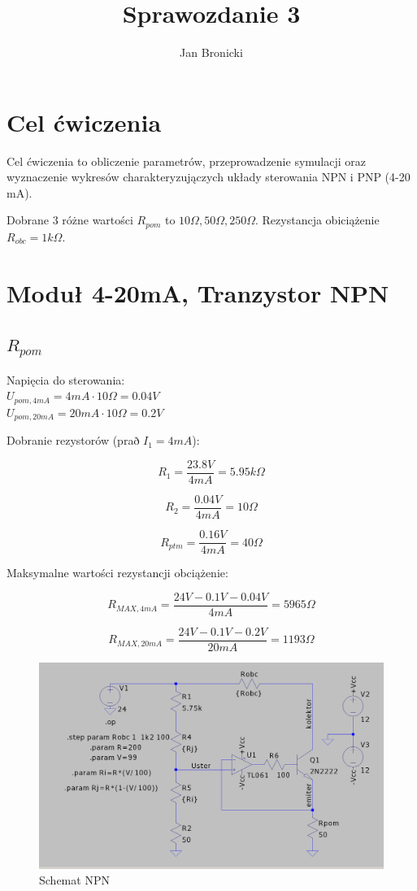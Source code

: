 \documentclass{article}
\title{Sprawozdanie 3}
\author{Jan Bronicki}
\date{}
\begin{document}
\maketitle

\section{Cel ćwiczenia}

Cel ćwiczenia to obliczenie parametrów, przeprowadzenie symulacji oraz wyznaczenie wykresów charakteryzujączych układy sterowania NPN i PNP (4-20 mA).

Dobrane 3 różne wartości $R_{pom}$ to $10\Omega, 50\Omega, 250\Omega$.
Rezystancja obiciążenie $R_{obc}=1k\Omega$.

\section{Moduł 4-20mA, Tranzystor NPN}

\subsection{$R_{pom}$}

Napięcia do sterowania:\\
$U_{pom, 4mA}=4mA\cdot 10\Omega=0.04V$\\
$U_{pom, 20mA}=20mA\cdot 10\Omega=0.2V$


Dobranie rezystorów (prað $I_{1}=4mA$):

$$
    R_{1}=\frac{23.8V}{4mA}=5.95k\Omega
$$

$$
    R_{2}=\frac{0.04V}{4mA}=10\Omega
$$


$$
    R_{ptm}=\frac{0.16V}{4mA}=40\Omega
$$


Maksymalne wartości rezystancji obciążenie:

$$
    R_{MAX, 4mA}=\frac{24V-0.1V-0.04V}{4mA}=5965\Omega
$$

$$
    R_{MAX, 20mA}=\frac{24V-0.1V-0.2V}{20mA}=1193\Omega
$$

\newpage

\begin{figure}[h!]
    \includegraphics[scale=0.2]{schemat1.png}
    \centering
    \caption{Schemat NPN}
\end{figure}
\end{document}
